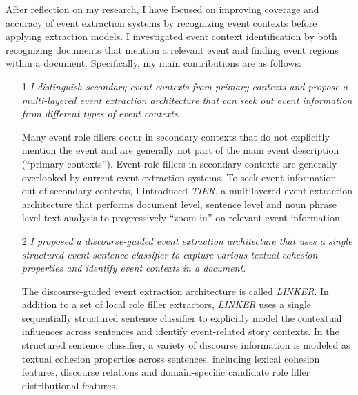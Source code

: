 After reflection on my research, I have focused on improving 
coverage and accuracy of event extraction systems by recognizing event contexts 
before applying extraction models. I investigated 
event context identification by both recognizing documents that mention 
a relevant event and finding event regions within a document. 
Specifically, my main contributions are as follows:

  \begin{enumerate}
   \item[1] {\em{I distinguish secondary event contexts from primary contexts and propose 
   a multi-layered event extraction architecture that can seek out event information from 
   different types of event contexts.}}
   
  Many event role fillers occur in secondary contexts that do not explicitly mention the event  
and are generally not part of the main event description (``primary contexts''). 
Event role fillers 
in secondary contexts 
are generally overlooked by current event extraction systems. 
To seek event information out of secondary contexts, 
I introduced {\it TIER}, a multilayered event extraction architecture 
that performs document level, sentence level and noun phrase level 
text analysis to progressively ``zoom in'' on relevant event information. 

   \item[2] {\em{I proposed a 
   discourse-guided event extraction architecture that 
   uses a single structured event sentence classifier to capture various textual 
   cohesion properties and identify 
   event contexts in a document.}}

The discourse-guided event extraction architecture is called {\it LINKER}. 
In addition to a set of local role filler extractors, 
{\it LINKER} uses a single 
sequentially structured sentence classifier to explicitly 
model the contextual influences across sentences 
and identify event-related story contexts. 
In the structured sentence classifier, a variety of discourse information 
is modeled as textual cohesion properties across sentences, including 
lexical cohesion features, discourse relations and domain-specific 
candidate role filler distributional features. 


\end{enumerate}
